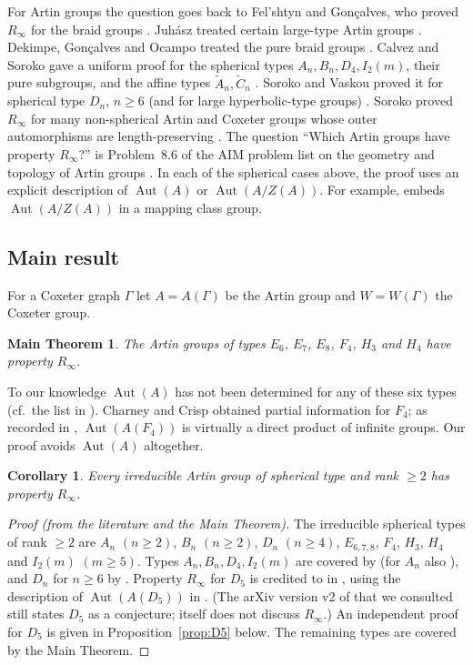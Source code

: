 \documentclass[11pt]{amsart}
\newtheorem*{mainthm}{Main Theorem}
\newtheorem*{maincor}{Corollary}
\theoremstyle{definition}
\newcommand{\Aut}{\operatorname{Aut}}
\newcommand{\Rinf}{R_\infty}
\begin{document}
For Artin groups the question goes back to Fel'shtyn and Gon\c{c}alves, who proved $\Rinf$ for the braid
groups \cite{FG10}. Juh\'asz treated certain large-type Artin groups \cite{Juh11}. Dekimpe, Gon\c{c}alves and
Ocampo treated the pure braid groups \cite{DGO21}. Calvez and Soroko gave a uniform proof for the spherical
types $A_n,B_n,D_4,I_2(m)$, their pure subgroups, and the affine types $\tilde A_n,\tilde C_n$ \cite{CS22}.
Soroko and Vaskou proved it for spherical type $D_n$, $n\ge 6$ (and for large hyperbolic-type groups)
\cite{SV24}. Soroko proved $\Rinf$ for many non-spherical Artin and Coxeter groups whose outer
automorphisms are length-preserving \cite{Sor26}. The question ``Which Artin groups have property $\Rinf$?''
is Problem~8.6 of the AIM problem list on the geometry and topology of Artin groups \cite{AIMPL}. In each of
the spherical cases above, the proof uses an explicit description of $\Aut(A)$ or $\Aut(A/Z(A))$. For example,
\cite{CS22} embeds $\Aut(A/Z(A))$ in a mapping class group.

\subsection{Main result}
For a Coxeter graph $\Gamma$ let $A=A(\Gamma)$ be the Artin group and $W=W(\Gamma)$ the Coxeter group.

\begin{mainthm}
The Artin groups of types $E_6$, $E_7$, $E_8$, $F_4$, $H_3$ and $H_4$ have property $\Rinf$.
\end{mainthm}

To our knowledge $\Aut(A)$ has not been determined for any of these six types (cf.~the list in
\cite[\S1]{PS26}). Charney and Crisp \cite[Prop.~9]{CC05} obtained partial information for $F_4$; as recorded in
\cite[\S4]{JMS25}, $\Aut(A(F_4))$ is virtually a direct product of infinite groups. Our proof avoids $\Aut(A)$
altogether.

\begin{maincor}
Every irreducible Artin group of spherical type and rank $\ge 2$ has property $\Rinf$.
\end{maincor}

\begin{proof}[Proof (from the literature and the Main Theorem)]
The irreducible spherical types of rank $\ge2$ are $A_n$ $(n\ge2)$, $B_n$ $(n\ge2)$, $D_n$ $(n\ge4)$,
$E_{6,7,8}$, $F_4$, $H_3$, $H_4$ and $I_2(m)$ $(m\ge5)$. Types $A_n,B_n,D_4,I_2(m)$ are covered by \cite{CS22}
(for $A_n$ also \cite{FG10}), and $D_n$ for $n\ge6$ by \cite[Thm.~1]{SV24}. Property $\Rinf$ for $D_5$ is credited
to \cite{SV24} in \cite[\S1]{Sor26}, using the description of $\Aut(A(D_5))$ in \cite{PS26}. (The arXiv version
v2 of \cite{SV24} that we consulted still states $D_5$ as a conjecture; \cite{PS26} itself does not discuss
$\Rinf$.) An independent proof for $D_5$ is given in Proposition~\ref{prop:D5} below. The remaining types are
covered by the Main Theorem.
\end{proof}
\end{document}
